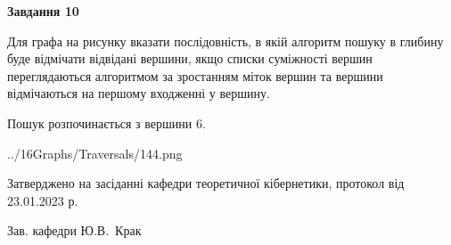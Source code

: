 \documentclass[12pt, ukrainian]{article}
\begin{document}
{\begin {large}
{\begin {center}\textbf{Завдання 10}\end {center}}\par
Для графа на рисунку вказати послідовність, в якій алгоритм пошуку в глибину буде відмічати відвідані вершини, якщо списки суміжності вершин переглядаються алгоритмом за зростанням міток вершин та вершини відмічаються на першому вход\-женні у вершину.\par
Пошук розпочинається з вершини 6.\par

\begin{center}
	{../16Graphs/Traversals/144.png}
\end{center}\par
\newpage


\end {large}
}
{\smallskip \begin {small} Затверджено на засіданні кафедри теоретичної кібернетики, протокол  від   23.01.2023 р.\par\smallskip\smallskip
{\parbox {6.5 cm}{Зав. кафедри \dotfill Ю.В.~Крак}} \end{small}}
\end{document}
